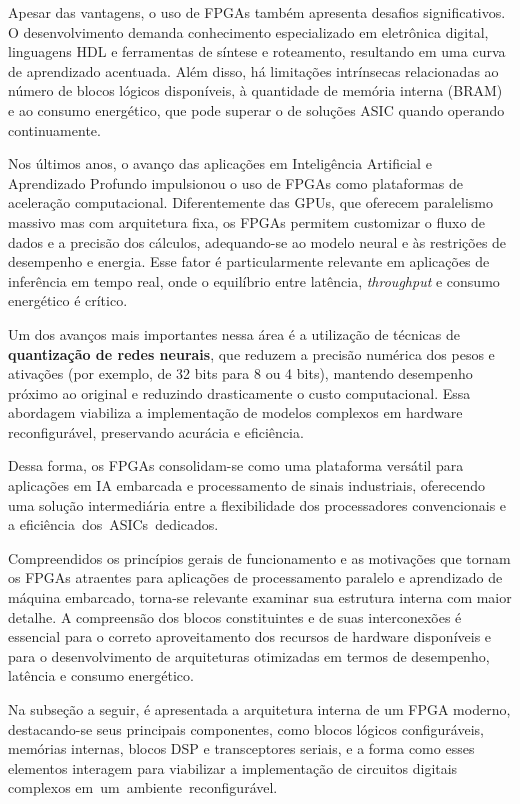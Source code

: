 Apesar das vantagens, o uso de FPGAs também apresenta desafios significativos. O desenvolvimento demanda conhecimento especializado em eletrônica digital, linguagens HDL e ferramentas de síntese e roteamento, resultando em uma curva de aprendizado acentuada. Além disso, há limitações intrínsecas relacionadas ao número de blocos lógicos disponíveis, à quantidade de memória interna (BRAM) e ao consumo energético, que pode superar o de soluções ASIC quando operando continuamente.

Nos últimos anos, o avanço das aplicações em Inteligência Artificial e Aprendizado Profundo  impulsionou o uso de FPGAs como plataformas de aceleração computacional. Diferentemente das GPUs, que oferecem paralelismo massivo mas com arquitetura fixa, os FPGAs permitem customizar o fluxo de dados e a precisão dos cálculos, adequando-se ao modelo neural e às restrições de desempenho e energia. Esse fator é particularmente relevante em aplicações de inferência em tempo real, onde o equilíbrio entre latência, \textit{throughput} e consumo energético é crítico.

Um dos avanços mais importantes nessa área é a utilização de técnicas de \textbf{quantização de redes neurais}, que reduzem a precisão numérica dos pesos e ativações (por exemplo, de 32 bits para 8 ou 4 bits), mantendo desempenho próximo ao original e reduzindo drasticamente o custo computacional. Essa abordagem viabiliza a implementação de modelos complexos em hardware reconfigurável, preservando acurácia e eficiência.

Dessa forma, os FPGAs consolidam-se como uma plataforma versátil para aplicações em IA embarcada e processamento de sinais industriais, oferecendo uma solução intermediária entre a flexibilidade dos processadores convencionais e a \mbox{eficiência dos ASICs dedicados.}

Compreendidos os princípios gerais de funcionamento e as motivações que tornam os FPGAs atraentes para aplicações de processamento paralelo e aprendizado de máquina embarcado, torna-se relevante examinar sua estrutura interna com maior detalhe. A compreensão dos blocos constituintes e de suas interconexões é essencial para o correto aproveitamento dos recursos de hardware disponíveis e para o desenvolvimento de arquiteturas otimizadas em termos de desempenho, latência e consumo energético.  

Na subseção a seguir, é apresentada a arquitetura interna de um FPGA moderno, destacando-se seus principais componentes, como blocos lógicos configuráveis, memórias internas, blocos DSP e transceptores seriais, e a forma como esses elementos interagem para viabilizar a implementação de circuitos digitais complexos \mbox{em um ambiente reconfigurável.}

